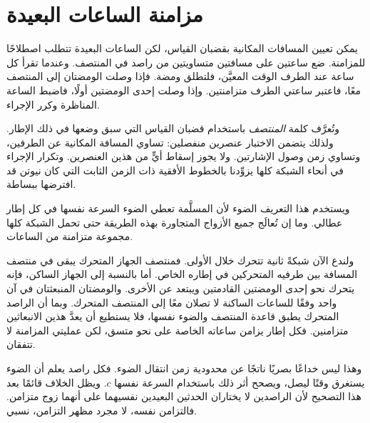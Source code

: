 \section{مزامنة الساعات البعيدة}

يمكن تعيين المسافات المكانية بقضبان القياس، لكن الساعات البعيدة تتطلب اصطلاحًا للمزامنة. ضع ساعتين على مسافتين متساويتين من راصد في المنتصف. وعندما تقرأ كل ساعة عند الطرف الوقت المعيَّن، فلتطلق ومضة. فإذا وصلت الومضتان إلى المنتصف معًا، فاعتبر ساعتي الطرف متزامنتين. وإذا وصلت إحدى الومضتين أولًا، فاضبط الساعة المناظرة وكرر الإجراء.

وتُعرَّف كلمة \emph{المنتصف} باستخدام قضبان القياس التي سبق وضعها في ذلك الإطار. ولذلك يتضمن الاختبار عنصرين منفصلين: تساوي المسافة المكانية عن الطرفين، وتساوي زمن وصول الإشارتين. ولا يجوز إسقاط أيٍّ من هذين العنصرين. وتكرار الإجراء في أنحاء الشبكة كلها يزوِّدنا بالخطوط الأفقية ذات الزمن الثابت التي كان نيوتن قد افترضها ببساطة.

ويستخدم هذا التعريف الضوء لأن المسلَّمة تعطي الضوء السرعة نفسها في كل إطار عطالي. وما إن تُعالَج جميع الأزواج المتجاورة بهذه الطريقة حتى تحمل الشبكة كلها مجموعة متزامنة من الساعات.

ولندع الآن شبكةً ثانية تتحرك خلال الأولى. فمنتصف الجهاز المتحرك يبقى في منتصف المسافة بين طرفيه المتحركين في إطاره الخاص. أما بالنسبة إلى الجهاز الساكن، فإنه يتحرك نحو إحدى الومضتين القادمتين ويبتعد عن الأخرى. والومضتان المنبعثتان في آن واحد وفقًا للساعات الساكنة لا تصلان معًا إلى المنتصف المتحرك. وبما أن الراصد المتحرك يطبق قاعدة المنتصف والضوء نفسها، فلا يستطيع أن يعدَّ هذين الانبعاثين متزامنين. فكل إطار يزامن ساعاته الخاصة على نحو متسق، لكن عمليتي المزامنة لا تتفقان.

وهذا ليس خداعًا بصريًا ناتجًا عن محدودية زمن انتقال الضوء. فكل راصد يعلم أن الضوء يستغرق وقتًا ليصل، ويصحح أثر ذلك باستخدام السرعة نفسها \(c\). ويظل الخلاف قائمًا بعد هذا التصحيح لأن الراصدين لا يختاران الحدثين البعيدين نفسيهما على أنهما زوج متزامن. فالتزامن نفسه، لا مجرد مظهر التزامن، نسبي.

\begin{classroomqa}
\end{classroomqa}

